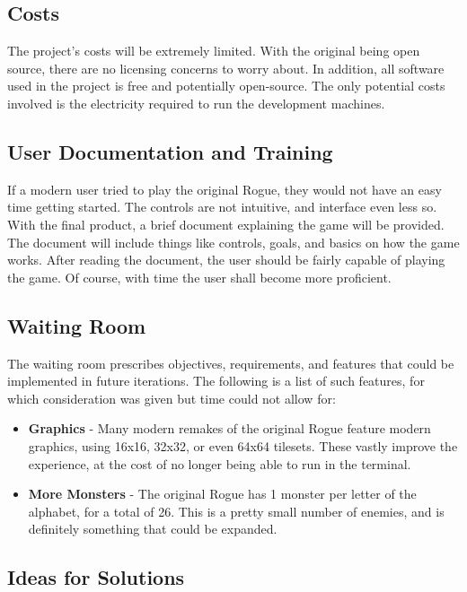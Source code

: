 \documentclass[12pt, titlepage]{article}
\begin{document}
	\subsection{Costs}

	The project's costs will be extremely limited. With the original being open source, there are no licensing concerns to worry about. In addition, all software used in the project is free and potentially open-source. The only potential costs involved is the electricity required to run the development machines.

	\subsection{User Documentation and Training}

	If a modern user tried to play the original Rogue, they would not have an easy time getting started. The controls are not intuitive, and interface even less so. With the final product, a brief document explaining the game will be provided. The document will include things like controls, goals, and basics on how the game works. After reading the document, the user should be fairly capable of playing the game. Of course, with time the user shall become more proficient.

	\subsection{Waiting Room}

	The waiting room prescribes objectives, requirements, and features that could be implemented in future iterations. The following is a list of such features, for which consideration was given but time could not allow for:
	\begin{itemize}
		\item \textbf{Graphics} - Many modern remakes of the original Rogue feature modern graphics, using 16x16, 32x32, or even 64x64 tilesets. These vastly improve the experience, at the cost of no longer being able to run in the terminal.
		\item \textbf{More Monsters} - The original Rogue has 1 monster per letter of the alphabet, for a total of 26. This is a pretty small number of enemies, and is definitely something that could be expanded.
	\end{itemize}

	\subsection{Ideas for Solutions}
\end{document}
